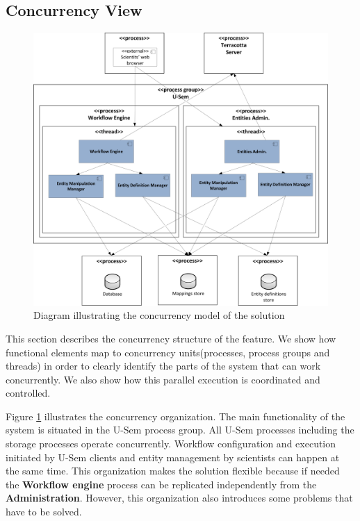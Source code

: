 \subsection{Concurrency View}

\begin{figure}[h!]
  \centering
  	\includegraphics[scale=0.5]{storage/functional/concur.png}
  \caption{Diagram illustrating the concurrency model of the solution}
  \label{fig:storageConc}
\end{figure}

This section describes the concurrency structure of the feature. We show how functional elements map to concurrency units(processes, process groups and threads) in order to clearly identify the parts of the system that can work concurrently. We also show how this parallel execution is coordinated and controlled.

Figure \ref{fig:storageConc} illustrates the concurrency organization. The main functionality of the system is situated in the U-Sem process group. All U-Sem processes including the storage processes operate concurrently. Workflow configuration and execution initiated by U-Sem clients and entity management by scientists can happen at the same time. This organization makes the solution flexible because if needed the \textbf{Workflow engine} process can be replicated independently from the \textbf{Administration}. However, this organization also introduces some problems that have to be solved.

